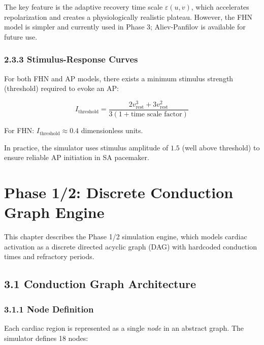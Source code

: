 \documentclass[12pt,oneside,a4paper]{book}
\begin{document}
The key feature is the adaptive recovery time scale $\varepsilon(u, v)$, which accelerates repolarization and creates a physiologically realistic plateau. However, the FHN model is simpler and currently used in Phase 3; Aliev-Panfilov is available for future use.

\subsection{2.3.3 Stimulus-Response Curves}

For both FHN and AP models, there exists a minimum stimulus strength (threshold) required to evoke an AP:

\begin{equation}
I_{\text{threshold}} = \frac{2v_{\text{rest}}^3 + 3v_{\text{rest}}^2}{3(1 + \text{time scale factor})}
\end{equation}

For FHN: $I_{\text{threshold}} \approx 0.4$ dimensionless units.

In practice, the simulator uses stimulus amplitude of $1.5$ (well above threshold) to ensure reliable AP initiation in SA pacemaker.


\chapter{Phase 1/2: Discrete Conduction Graph Engine}

This chapter describes the Phase 1/2 simulation engine, which models cardiac activation as a discrete directed acyclic graph (DAG) with hardcoded conduction times and refractory periods.

\section{3.1 Conduction Graph Architecture}

\subsection{3.1.1 Node Definition}

Each cardiac region is represented as a single \emph{node} in an abstract graph. The simulator defines 18 nodes:
\end{document}
